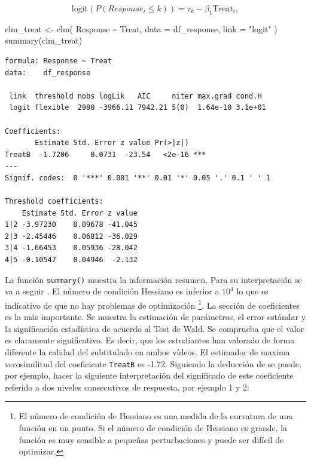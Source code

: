 \documentclass[
  12pt,
  a4paper,
  extrafontsizes,
  onecolumn,
  openright,
  table]{memoir}
\newenvironment{Shaded}{\begin{snugshade}}{\end{snugshade}}
\newcommand{\AttributeTok}[1]{\textcolor[rgb]{0.40,0.45,0.13}{#1}}
\newcommand{\FunctionTok}[1]{\textcolor[rgb]{0.28,0.35,0.67}{#1}}
\newcommand{\NormalTok}[1]{\textcolor[rgb]{0.00,0.23,0.31}{#1}}
\newcommand{\OtherTok}[1]{\textcolor[rgb]{0.00,0.23,0.31}{#1}}
\newcommand{\SpecialCharTok}[1]{\textcolor[rgb]{0.37,0.37,0.37}{#1}}
\newcommand{\StringTok}[1]{\textcolor[rgb]{0.13,0.47,0.30}{#1}}
\begin{document}
\[
\text{logit}(P(Response_i \leq k)) = \tau_k - \beta_1 \text{Treat}_i,
\]

\scriptsize

\begin{Shaded}
\begin{Highlighting}[]
\NormalTok{clm\_treat }\OtherTok{\textless{}{-}}
    \FunctionTok{clm}\NormalTok{(}
\NormalTok{        Response }\SpecialCharTok{\textasciitilde{}}\NormalTok{ Treat,}
        \AttributeTok{data =}\NormalTok{ df\_response, }\AttributeTok{link =} \StringTok{"logit"}
\NormalTok{    )}
\FunctionTok{summary}\NormalTok{(clm\_treat)}
\end{Highlighting}
\end{Shaded}

\begin{verbatim}
formula: Response ~ Treat
data:    df_response

 link  threshold nobs logLik   AIC     niter max.grad cond.H 
 logit flexible  2980 -3966.11 7942.21 5(0)  1.64e-10 3.1e+01

Coefficients:
       Estimate Std. Error z value Pr(>|z|)    
TreatB  -1.7206     0.0731  -23.54   <2e-16 ***
---
Signif. codes:  0 '***' 0.001 '**' 0.01 '*' 0.05 '.' 0.1 ' ' 1

Threshold coefficients:
    Estimate Std. Error z value
1|2 -3.97230    0.09678 -41.045
2|3 -2.45446    0.06812 -36.029
3|4 -1.66453    0.05936 -28.042
4|5 -0.10547    0.04946  -2.132
\end{verbatim}

\normalsize

La función \texttt{summary()} muestra la información resumen. Para su
interpretación se va a seguir \textcite{christensen2018CumulativeLM}. El
número de condición Hessiano es inferior a \(10^4\) lo que es indicativo
de que no hay problemas de optimización \footnote{El número de condición
  de Hessiano es una medida de la curvatura de una función en un punto.
  Si el número de condición de Hessiano es grande, la función es muy
  sensible a pequeñas perturbaciones y puede ser difícil de optimizar.}.
La sección de coeficientes es la más importante. Se muestra la
estimación de parámetros, el error estándar y la significación
estadística de acuerdo al Test de Wald. Se comprueba que el valor es
claramente significativo. Es decir, que los estudiantes han valorado de
forma diferente la calidad del subtitulado en ambos vídeos. El estimador
de maxima verosimilitud del coeficiente \texttt{TreatB} es -1.72.
Siguiendo la deducción de \textcite{bruin2011} se puede, por ejemplo,
hacer la siguiente interpretación del significado de este coeficiente
referido a dos niveles consecutivos de respuesta, por ejemplo 1 y 2:
\end{document}
